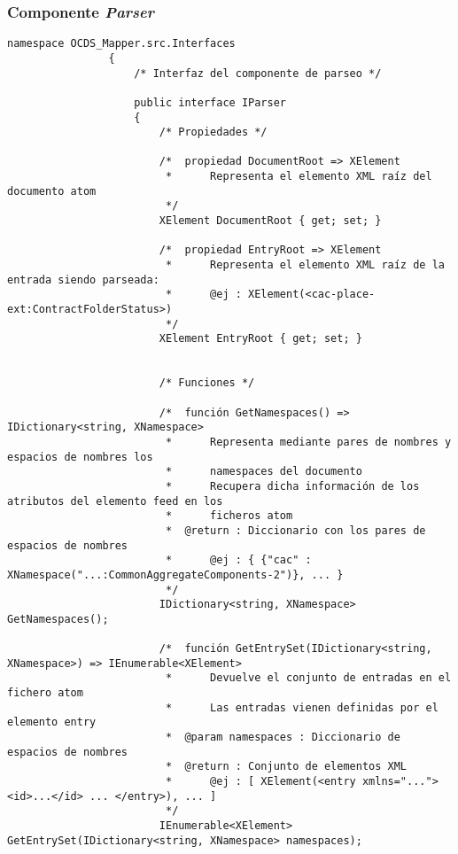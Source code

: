         \subsubsection{Componente \textit{Parser}}
            \begin{lstlisting}[language=lCSharp]
                namespace OCDS_Mapper.src.Interfaces
                {
                    /* Interfaz del componente de parseo */
                    
                    public interface IParser
                    {
                        /* Propiedades */
                
                        /*  propiedad DocumentRoot => XElement
                         *      Representa el elemento XML raíz del documento atom
                         */
                        XElement DocumentRoot { get; set; }
                
                        /*  propiedad EntryRoot => XElement
                         *      Representa el elemento XML raíz de la entrada siendo parseada:
                         *      @ej : XElement(<cac-place-ext:ContractFolderStatus>)
                         */
                        XElement EntryRoot { get; set; }
                
                
                        /* Funciones */
                
                        /*  función GetNamespaces() => IDictionary<string, XNamespace>
                         *      Representa mediante pares de nombres y espacios de nombres los 
                         *      namespaces del documento
                         *      Recupera dicha información de los atributos del elemento feed en los
                         *      ficheros atom
                         *  @return : Diccionario con los pares de espacios de nombres
                         *      @ej : { {"cac" : XNamespace("...:CommonAggregateComponents-2")}, ... }
                         */
                        IDictionary<string, XNamespace> GetNamespaces();
                
                        /*  función GetEntrySet(IDictionary<string, XNamespace>) => IEnumerable<XElement>
                         *      Devuelve el conjunto de entradas en el fichero atom
                         *      Las entradas vienen definidas por el elemento entry
                         *  @param namespaces : Diccionario de espacios de nombres
                         *  @return : Conjunto de elementos XML
                         *      @ej : [ XElement(<entry xmlns="..."> <id>...</id> ... </entry>), ... ]
                         */
                        IEnumerable<XElement> GetEntrySet(IDictionary<string, XNamespace> namespaces);
                

\end{lstlisting}
